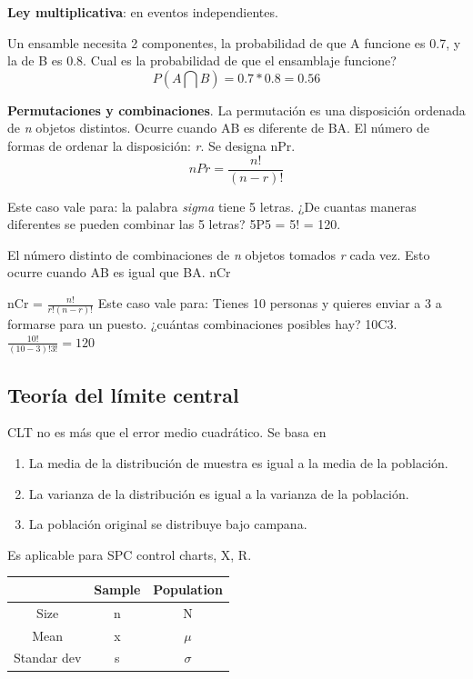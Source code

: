 \documentclass[]{article}
\begin{document}
\textbf{Ley multiplicativa}: en eventos independientes.

Un ensamble necesita 2 componentes, la probabilidad de que A funcione es 0.7, y la de B es 0.8. Cual es la probabilidad de que el ensamblaje funcione? \begin{equation}
P(A \bigcap B) = 0.7*0.8 = 0.56
\end{equation}

\textbf{Permutaciones y combinaciones}. \newline La permutación es una disposición ordenada de \textit{n} objetos distintos. Ocurre cuando AB es diferente de BA. El número de formas de ordenar la disposición: \textit{r}. Se designa nPr.
\begin{equation}
nPr = \frac{n!}{(n-r)!}
\end{equation}

Este caso vale para: la palabra \textit{sigma} tiene 5 letras. ¿De cuantas maneras diferentes se pueden combinar las 5 letras? 5P5 = 5! = 120.

El número distinto de combinaciones de \textit{n} objetos tomados \textit{r} cada vez. Esto ocurre cuando AB es igual que BA. nCr

nCr = $\frac{n!}{r!(n-r)!}$
Este caso vale para: Tienes 10 personas y quieres enviar a 3 a formarse para un puesto. ¿cuántas combinaciones posibles hay? 10C3. $\frac{10!}{(10-3)!3!} = 120$

\subsection{Teoría del límite central}

CLT no es más que el error medio cuadrático. Se basa en

\begin{enumerate}
	\item La media de la distribución de muestra es igual a la media de la población.
	\item La varianza de la distribución es igual a la varianza de la población.
	\item La población original se distribuye bajo campana.
\end{enumerate}

Es aplicable para SPC control charts, X, R.

\begin{tabular}{|c|c|c|}
	\hline  & Sample & Population \\ 
	\hline Size & n & N \\ 
	\hline Mean & x & $\mu$ \\ 
	\hline Standar dev & s & $\sigma$ \\ 
	\hline 
\end{tabular} 
\end{document}

